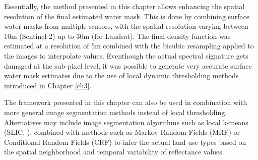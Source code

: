 Essentially, the method presented in this chapter allows enhancing the spatial resolution of the final estimated water mask. This is done by combining surface water masks from multiple sensors, with the spatial resolution varying between 10m (Sentinel-2) up to 30m (for Landsat). The final density function was estimated at a resolution of 5m combined with the bicubic resampling applied to the images to interpolate values. Eventhough the actual spectral signature gets damaged at the sub-pixel level, it was possible to generate very accurate surface water mask estimates due to the use of local dynamic thresholding methods introduced in Chapter \ref{ch3}.

The framework presented in this chapter can also be used in combination with more general image segmentation methods instead of local thresholding. Alternatives may include image segmentation algorithms such as local k-means (SLIC, \citet{achanta2012slic}), combined with methods such as Markov Random Fields (MRF) or Conditional Random Fields (CRF) to infer the actual land use types based on the spatial neighborhood and temporal variability of reflectance values.
